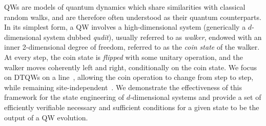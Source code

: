 


\acp{QW} are models of quantum dynamics which share similarities with classical random walks, and are therefore often understood as their quantum counterparts.
In its simplest form, a \ac{QW} involves a high-dimensional system (generically a $d$-dimensional system dubbed \textit{qudit}), usually referred to as \emph{walker}, endowed with an inner 2-dimensional degree of freedom, referred to as the \emph{coin state} of the walker. 
At every step, the coin state is \emph{flipped} with some unitary operation, and the walker moves coherently left and right, conditionally on the coin state.
We focus on \acp{DTQW} on a line~\cite{ambainis2001onedimensional}, allowing the coin operation to change from step to step, while remaining site-independent~\cite{ribeiro2004aperiodic,wjcik2004quasiperiodic,bauls2006quantum}.
We demonstrate the effectiveness of this framework for the state engineering of $d$-dimensional systems and provide a set of efficiently verifiable necessary and sufficient conditions for a given state to be the output of a \ac{QW} evolution.	

